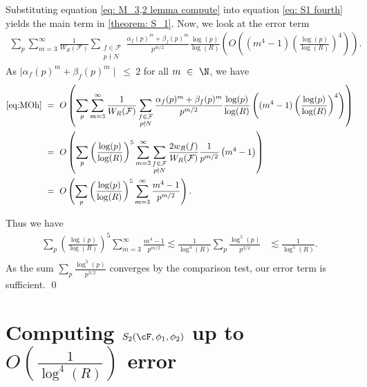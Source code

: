 \documentclass[11pt, reqno]{amsart}
\theoremstyle{definition}
\theoremstyle{remark}
\numberwithin{equation}{section}
\begin{document}
Substituting equation \eqref{eq: M_3,2 lemma compute} into equation \eqref{eq: S1 fourth} yields the main term in \eqref{theorem: S_1}.
Now, we look at the error term
\begin{align}
    \sum_p\sum_{m=3}^{\infty}\frac{1}{W_R(\mathcal{F})}\sum_{\substack{f \in \mathcal{F}\\p \nmid N}}\frac{\alpha_f(p)^{m}+\beta_f(p)^{m}}{p^{m/2}} \frac{\log(p)}{\log(R)}\left(O\left((m^4-1)\left(\frac{\log(p)}{\log(R)} \right)^4 \right) \right).\label{eq:MOh}
\end{align}
As $\mid \alpha_f(p)^m+\beta_f(p)^m\mid \ \leq \ 2$ for all $m \ \in \ \N$, we have
\begin{align}
   \eqref{eq:MOh}\ &=\ O \left( \sum_p\sum_{m=3}^{\infty}\frac{1}{W_R(\mathcal{F})}\sum_{\substack{f \in \mathcal{F}\\p \nmid N}}\frac{\alpha_f(p)^{m}+\beta_f(p)^{m}}{p^{m/2}} \frac{\log(p)}{\log(R)}\left((m^4-1)\left(\frac{\log(p)}{\log(R)} \right)^4 \right) \right) \notag \\
   \ &=\ O \left( \sum_p \left( \frac{\log(p)}{\log(R)} \right)^5 \sum_{m=3}^{\infty} \sum_{\substack{f \in \mathcal{F}\\p \nmid N}} \frac{2 w_R(f)}{W_R(\mathcal{F})}\frac{1}{p^{m/2}} \left(m^4-1\right) \right) \notag \\
   \ &=\ O \left( \sum_p \left( \frac{\log(p)}{\log(R)} \right)^5 \sum_{m=3}^{\infty} \frac{m^4-1}{p^{m/2}} \right).
\end{align}

Thus we have 
\begin{align}
    \sum_p \left( \frac{\log(p)}{\log(R)} \right)^5 \sum_{m=3}^{\infty} \frac{m^4-1}{p^{m/2}} \lesssim \frac{1}{\log^4(R)}\sum_p\frac{\log^5 (p)}{p^{3/2}}
    &\lesssim  \frac{1}{\log^5(R)}.\\
\end{align}
As the sum $\sum_p\frac{\log^5 (p)}{p^{3/2}}$ converges by the comparison test, our error term is sufficient.
\qed

\vspace{1em}

\newpage

\section{\texorpdfstring{Computing ${S_2(\cF,\phi_1,\phi_2)}$ up to ${O\left(\frac{1}{\log^4(R)}\right)}$ error}{Computing S2 up to 1/log4 R error}} \label{chp: S2 compute chp}
\end{document}

